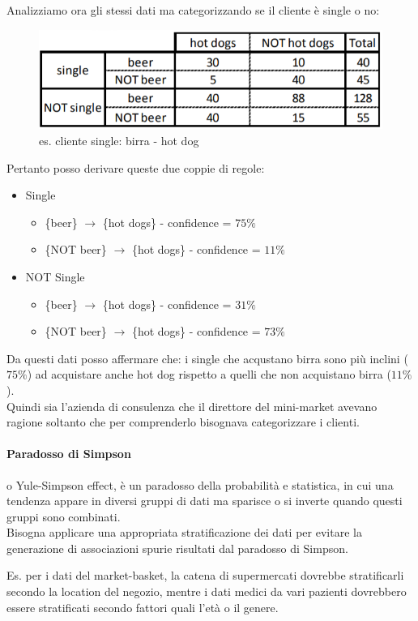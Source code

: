 Analizziamo ora gli stessi dati ma categorizzando se il cliente è single o no:
\begin{figure}[H]
	\centering
	\includegraphics[height=0.2 \linewidth]{association/pict/beer_hotdog_single.png}
	\caption{es. cliente single: birra - hot dog}
\end{figure}
Pertanto posso derivare queste due coppie di regole:
\begin{itemize}
	\item Single
	\begin{itemize}
		\item \{beer\} $\rightarrow$ \{hot dogs\} - confidence = $75\%$
		\item \{NOT beer\} $\rightarrow$ \{hot dogs\} - confidence = $11\%$
	\end{itemize}
	\item NOT Single
	\begin{itemize}
		\item \{beer\} $\rightarrow$ \{hot dogs\} - confidence = $31\%$
		\item \{NOT beer\} $\rightarrow$ \{hot dogs\} - confidence = $73\%$
	\end{itemize}
\end{itemize}
Da questi dati posso affermare che: i single che acqustano birra sono più inclini ($75\%$) ad acquistare anche hot dog rispetto a quelli che non acquistano birra ($11\%$).\\

Quindi sia l'azienda di consulenza che il direttore del mini-market avevano ragione soltanto che per comprenderlo bisognava categorizzare i clienti. 

\paragraph{Paradosso di Simpson} o Yule-Simpson effect, è un paradosso della probabilità e statistica, in cui una tendenza appare in diversi gruppi di dati ma sparisce o si inverte quando questi gruppi sono combinati. \\

Bisogna applicare una appropriata stratificazione dei dati per evitare la generazione di associazioni spurie risultati dal paradosso di Simpson. 

Es. per i dati del market-basket, la catena di supermercati dovrebbe stratificarli secondo la location del negozio, mentre i dati medici da vari pazienti dovrebbero essere stratificati secondo fattori quali l'età o il genere.